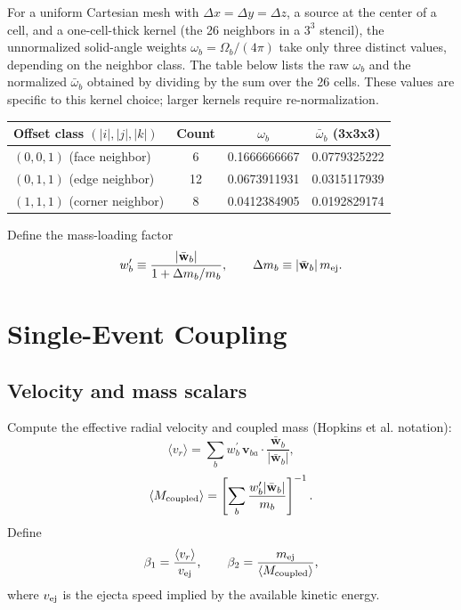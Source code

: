 \documentclass[11pt]{article}
\begin{document}
For a uniform Cartesian mesh with $\Delta x=\Delta y=\Delta z$, a source at the
center of a cell, and a one-cell-thick kernel (the 26 neighbors in a $3^{3}$
stencil), the unnormalized solid-angle weights $\omega_{b}=\Omega_{b}/(4\pi)$
take only three distinct values, depending on the neighbor class. The table
below lists the raw $\omega_{b}$ and the normalized $\bar\omega_{b}$
obtained by dividing by the sum over the 26 cells. These values are specific to
this kernel choice; larger kernels require re-normalization.

\begin{center}
\begin{tabular}{lccc}
\hline
Offset class $(|i|,|j|,|k|)$ & Count & $\omega_{b}$ & $\bar\omega_{b}$ (3x3x3) \\
\hline
$(0,0,1)$ (face neighbor) & 6  & 0.1666666667 & 0.0779325222 \\
$(0,1,1)$ (edge neighbor) & 12 & 0.0673911931 & 0.0315117939 \\
$(1,1,1)$ (corner neighbor) & 8  & 0.0412384905 & 0.0192829174 \\
\hline
\end{tabular}
\end{center}

Define the mass-loading factor
\begin{equation}
w^{\prime}_{b} \equiv \frac{|\bar{\mathbf w}_{b}|}{1 + \Delta m_{b}/m_{b}},
\qquad
\Delta m_{b} \equiv |\bar{\mathbf w}_{b}|\,m_{\rm ej}.
\end{equation}

\section{Single-Event Coupling}
\subsection{Velocity and mass scalars}
Compute the effective radial velocity and coupled mass (Hopkins et al. notation):
\begin{equation}
\langle v_{r}\rangle = \sum_{b} w^{\prime}_{b}\,\mathbf v_{ba}\cdot\frac{\bar{\mathbf w}_{b}}{|\bar{\mathbf w}_{b}|},
\end{equation}
\begin{equation}
\langle M_{\rm coupled}\rangle = \left[\sum_{b}\frac{w^{\prime}_{b}|\bar{\mathbf w}_{b}|}{m_{b}}\right]^{-1}.
\end{equation}
Define
\begin{equation}
\beta_{1} = \frac{\langle v_{r}\rangle}{v_{\rm ej}}, \qquad
\beta_{2} = \frac{m_{\rm ej}}{\langle M_{\rm coupled}\rangle},
\end{equation}
where $v_{\rm ej}$ is the ejecta speed implied by the available kinetic energy.
\end{document}
